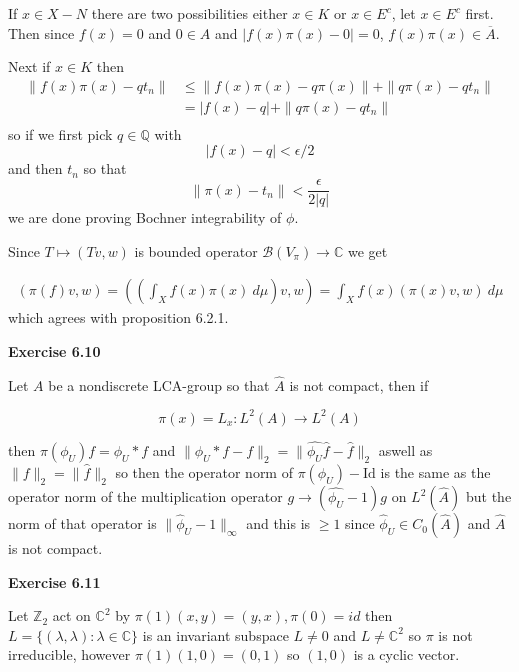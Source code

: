 \documentclass{article}
\begin{document}
If $x \in X - N$ there are two possibilities either $x \in K$ or $x \in E^c$, let $x \in E^c$ first. Then since $f(x) = 0$ and $0 \in A$ and $|f(x)\pi(x) - 0 | = 0$, $f(x)\pi(x) \in \overline A$.

Next if $x \in K$ then 
\begin{align*}
    \|f(x)\pi(x) - qt_n\| & \leq  \| f(x) \pi(x) - q \pi(x) \| + \| q\pi(x) - qt_n \|\\
    & = | f(x) - q| + \| q\pi(x) - qt_n \|\\
\end{align*}
so if we first pick $q \in \mathbb Q$ with 
$$|f(x) - q| < \epsilon/2$$ 
and then $t_n$ so that 
$$\|\pi(x) - t_n\| < \frac{\epsilon}{2 |q|}$$ 
we are done proving Bochner integrability of $\phi$. 

Since $T \mapsto (Tv,w)$ is bounded operator $\mathcal B(V_\pi) \rightarrow \mathbb C$ we get 

\begin{align*}
    (\pi(f)v,w) = ( (\int_X f(x) \pi(x) \ d \mu)v, w) =  \int_X f(x) (\pi(x)v,w) \ d \mu
\end{align*}
which agrees with proposition 6.2.1.
\vspace{0.5cm}

\textbf{Exercise 6.10}

\vspace{0.5cm}

Let $A$ be a nondiscrete LCA-group so that $\widehat A$ is not compact, then if 

$$\pi(x) = L_x : L^2(A) \rightarrow L^2(A)$$

then $\pi(\phi_U)f = \phi_U * f$ and $\|\phi_U * f - f\|_2 = \|\widehat{\phi_U} \widehat f - \widehat f\|_2$ aswell as $\|f \|_2 = \|\hat f\|_2$ so then the operator norm of $\pi(\phi_U) - \text{Id}$ is the same as the operator norm of the multiplication operator $g \rightarrow (\widehat{\phi_U} - 1)g$ on $L^2(\widehat A)$ but the norm of that operator is $\|\widehat\phi_U - 1\|_{\infty}$ and this is $\geq 1$ since $\widehat \phi_U \in C_0(\widehat A)$ and $\widehat A$ is not compact.
\vspace{0.5cm}

\textbf{Exercise 6.11}

\vspace{0.5cm}

Let $\mathbb Z_2$ act on $\mathbb C^2$ by $\pi(1)(x,y) = (y,x), \pi(0) = id$ then $L =\{(\lambda, \lambda): \lambda \in \mathbb C \}$ is an invariant subspace $L \neq 0$ and $L \neq \mathbb C^2$ so $\pi$ is not irreducible, however $\pi(1)(1,0) = (0,1)$ so $(1,0)$ is a cyclic vector.
\vspace{0.5cm}
\end{document}
